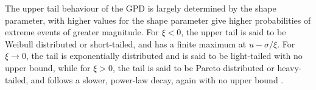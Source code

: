 \documentclass{article}
\numberwithin{equation}{section}
\begin{document}
The upper tail behaviour of the GPD is largely determined by the shape parameter, with higher values for the shape parameter give higher probabilities of extreme events of greater magnitude. 
For $\xi <0$, the upper tail is said to be Weibull distributed or short-tailed, and has a finite maximum at $u - \sigma/\xi$.
For $\xi \to 0$, the tail is exponentially distributed and is said to be light-tailed with no upper bound, while for $\xi > 0$, the tail is said to be Pareto distributed or heavy-tailed, and follows a slower, power-law decay, again with no upper bound \cite{Rohrbeck2021} \cite{Carreau2017}.



\end{document}
